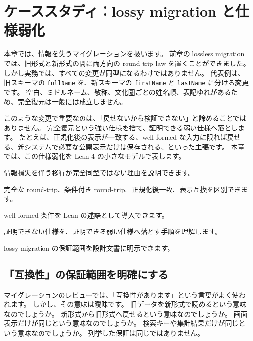 \chapter{ケーススタディ：lossy migration と仕様弱化}
\label{chap:ch29_lossy_migration}

\begin{chapterabstract}
本章では、情報を失うマイグレーションを扱います。
前章の lossless migration では、旧形式と新形式の間に両方向の round-trip law を置くことができました。
しかし実務では、すべての変更が同型になるわけではありません。
代表例は、旧スキーマの \texttt{fullName} を、新スキーマの \texttt{firstName} と \texttt{lastName} に分ける変更です。
空白、ミドルネーム、敬称、文化圏ごとの姓名順、表記ゆれがあるため、完全復元は一般には成立しません。

このような変更で重要なのは、「戻せないから検証できない」と諦めることではありません。
完全復元という強い仕様を捨て、証明できる弱い仕様へ落とします。
たとえば、正規化後の表示が一致する、well-formed な入力に限れば戻せる、新システムで必要な公開表示だけは保存される、といった主張です。
本章では、この仕様弱化を Lean 4 の小さなモデルで表します。
\end{chapterabstract}

\begin{learninggoals}
\item 情報損失を伴う移行が完全同型ではない理由を説明できます。
\item 完全な round-trip、条件付き round-trip、正規化後一致、表示互換を区別できます。
\item well-formed 条件を Lean の述語として導入できます。
\item 証明できない仕様を、証明できる弱い仕様へ落とす手順を理解します。
\item lossy migration の保証範囲を設計文書に明示できます。
\end{learninggoals}

\section{「互換性」の保証範囲を明確にする}

マイグレーションのレビューでは、「互換性があります」という言葉がよく使われます。
しかし、その意味は曖昧です。
旧データを新形式で読めるという意味なのでしょうか。
新形式から旧形式へ戻せるという意味なのでしょうか。
画面表示だけが同じという意味なのでしょうか。
検索キーや集計結果だけが同じという意味なのでしょうか。
列挙した保証は同じではありません。

